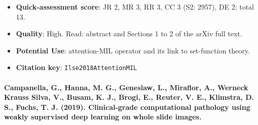 \documentclass[journal,onecolumn]{IEEEtran}
\begin{document}
\begin{itemize}
\item{} \textbf{Quick-assessment score}: JR 2, MR 3, RR 3, CC 3 (S2: 2957), DE 2; total 13.

\item{} \textbf{Quality}: High. Read: abstract and Sections 1 to 2 of the arXiv full text.

\item{} \textbf{Potential Use}: attention-MIL operator and its link to set-function theory.

\item{} \textbf{Citation key}: \texttt{Ilse2018AttentionMIL}

\end{itemize}

\paragraph{Campanella, G., Hanna, M. G., Geneslaw, L., Miraflor, A., Werneck Krauss Silva, V., Busam, K. J., Brogi, E., Reuter, V. E., Klimstra, D. S., Fuchs, T. J. (2019). Clinical-grade computational pathology using weakly supervised deep learning on whole slide images.~\cite{Campanella2019Clinical}}\mbox{}
\end{document}
